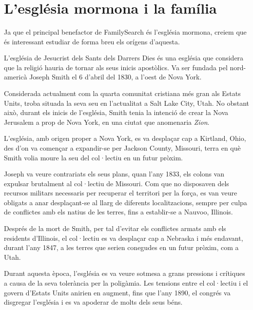 \section{L'església mormona i la família}

    \paragraph{}
    Ja que el principal benefactor de FamilySearch és l'església mormona, creiem que és interessant estudiar de forma breu els orígens d'aquesta.

    L’església de Jesucrist dels Sants dels Darrers Dies és una església que considera que la religió hauria de tornar als seus inicis apostòlics. Va ser fundada pel nord-americà Joseph Smith el 6 d’abril del 1830, a l'oest de Nova York.

    Considerada actualment com la quarta comunitat cristiana més gran als Estats Units, troba situada la seva seu en l'actualitat a Salt Lake City, Utah. No obstant això, durant els inicis de l’església, Smith tenia la intenció de crear la Nova Jerusalem a prop de Nova York, en una ciutat que anomenaria \emph{Zion}.

    L’església, amb origen proper a Nova York, es va desplaçar cap a Kirtland, Ohio, des d'on va començar a expandir-se per Jackson County, Missouri, terra en què Smith volia moure la seu del col·lectiu en un futur pròxim.

    Joseph va veure contrariats els seus plans, quan l'any 1833, els colons van expulsar brutalment al col·lectiu de Missouri. Com que no disposaven dels recursos militars necessaris per recuperar el territori per la força, es van veure obligats a anar desplaçant-se al llarg de diferents localitzacions, sempre per culpa de conflictes amb els natius de les terres, fins a establir-se a Nauvoo, Illinois.

    Després de la mort de Smith, per tal d'evitar els conflictes armats amb els residents d'Illinois, el col·lectiu es va desplaçar cap a Nebraska i més endavant, durant l'any 1847, a les terres que serien conegudes en un futur pròxim, com a Utah.

    Durant aquesta època, l'església es va veure sotmesa a grans pressions i crítiques a causa de la seva tolerància per la poligàmia. Les tensions entre el col·lectiu i el govern d'Estats Units anirien en augment, fins que l'any 1890, el congrés va disgregar l'església i es va apoderar de molts dels seus béns.

